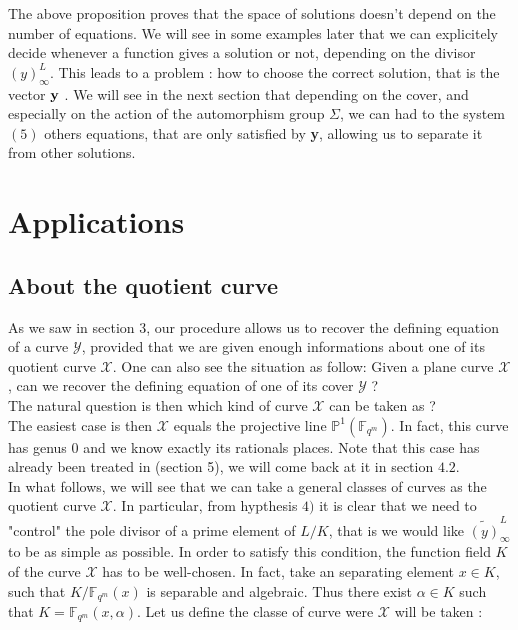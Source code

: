 \documentclass[10pt]{article}
\newcommand{\s}{\vspace{0.3cm}}
\newcommand{\fqm}{\mathbb{F}_{q^m}}
\newcommand{\X}{\mathcal{X}}
\newcommand{\Y}{\mathcal{Y}}
\begin{document}
\s

The above proposition proves that the space of solutions doesn't depend on the number of equations. 
We will see in some examples later that we can explicitely decide whenever a function gives a solution or not, depending on the divisor $(y)^L_{\infty}$. This leads to a problem : how to choose the correct solution, that is the vector $\bf{y}$ \rm. We will see in the next section that depending on the cover, and especially on the action of the automorphism group $\Sigma$,  we can had to the system $(5)$ others equations, that are only satisfied by \textbf{y}, allowing us to separate it from other solutions.

\s
\section{Applications}

\s

\subsection{About the quotient curve}

\s


As we saw in section 3, our procedure allows us to recover the defining equation of a curve $\Y$, provided that we are given enough informations about one of its quotient curve $\X$. One can also see the situation as follow: Given a plane curve $\X$, can we recover the defining equation of one of its cover $\Y$ ? \\ The natural question is then which kind of curve $\X$ can be taken as ? \\

The easiest case is then $\X$ equals the projective line $\mathbb{P}^1(\fqm)$. In fact, this curve has genus 0 and we know exactly its rationals places. Note that this case has already been treated in \cite{Bar} (section 5), we will come back at it in section $4.2$.
\\

In what follows, we will see that we can take a general classes of curves as the quotient curve $\X$. In particular, from hypthesis $4)$ it is clear that we need to "control" the pole divisor of a prime element of $L/K$, that is we would like $\widetilde{(y)}^L_{\infty}$ to be as simple as possible. In order to satisfy this condition, the function field $K$ of the curve $\X$ has to be well-chosen. In fact, take an separating element $x \in K$, such that $K/\fqm(x)$ is separable and algebraic. Thus there exist $\alpha \in K$ such that $K=\fqm(x,\alpha)$. Let us define the classe of curve were $\X$ will be taken :
\end{document}

